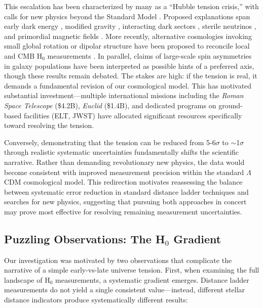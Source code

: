 \documentclass[preprint, linenumbers]{aastex701}
\begin{document}
This escalation has been characterized by many as a ``Hubble tension crisis,'' with calls for new physics beyond the Standard Model \citep{DiValentino2021}. Proposed explanations span early dark energy \citep{Poulin2019}, modified gravity \citep{Marra2021}, interacting dark sectors \citep{DiValentino2020}, sterile neutrinos \citep{Anchordoqui2022}, and primordial magnetic fields \citep{Jedamzik2020}. More recently, alternative cosmologies invoking small global rotation or dipolar structure have been proposed to reconcile local and CMB H$_0$ measurements \citep{Szigeti2025}. In parallel, claims of large-scale spin asymmetries in galaxy populations \citep{Shamir2024, Shamir2025} have been interpreted as possible hints of a preferred axis, though these results remain debated. The stakes are high: if the tension is real, it demands a fundamental revision of our cosmological model. This has motivated substantial investment---multiple international missions including the \textit{Roman Space Telescope} (\$4.2B), \textit{Euclid} (\$1.4B), and dedicated programs on ground-based facilities (ELT, JWST) have allocated significant resources specifically toward resolving the tension.

Conversely, demonstrating that the tension can be reduced from 5-6$\sigma$ to $\sim$1$\sigma$ through realistic systematic uncertainties fundamentally shifts the scientific narrative. Rather than demanding revolutionary new physics, the data would become consistent with improved measurement precision within the standard $\Lambda$CDM cosmological model. This redirection motivates reassessing the balance between systematic error reduction in standard distance ladder techniques and searches for new physics, suggesting that pursuing both approaches in concert may prove most effective for resolving remaining measurement uncertainties.

\subsection{Puzzling Observations: The H$_0$ Gradient}

Our investigation was motivated by two observations that complicate the narrative of a simple early-vs-late universe tension. First, when examining the full landscape of H$_0$ measurements, a systematic gradient emerges. Distance ladder measurements do not yield a single consistent value---instead, different stellar distance indicators produce systematically different results:
\end{document}
